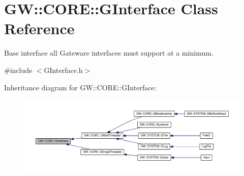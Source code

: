 \hypertarget{classGW_1_1CORE_1_1GInterface}{}\section{GW\+:\+:C\+O\+RE\+:\+:G\+Interface Class Reference}
\label{classGW_1_1CORE_1_1GInterface}


Base interface all Gateware interfaces must support at a minimum.  




{\ttfamily \#include $<$G\+Interface.\+h$>$}



Inheritance diagram for GW\+:\+:C\+O\+RE\+:\+:G\+Interface\+:
\nopagebreak
\begin{figure}[H]
\begin{center}
\leavevmode
\includegraphics[width=350pt]{classGW_1_1CORE_1_1GInterface__inherit__graph}
\end{center}
\end{figure}
